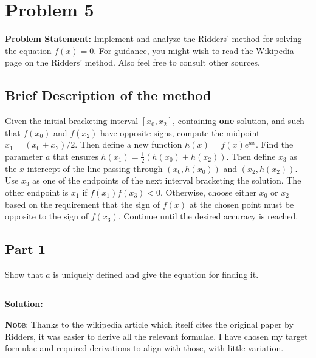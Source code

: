 \clearpage
\section*{Problem 5}

\textbf{Problem Statement:} Implement and analyze the Ridders' method for solving the equation $f(x) = 0$. For guidance, you might wish to read the Wikipedia page on the Ridders' method. Also feel free to consult other sources.

\subsection*{Brief Description of the method}

Given the initial bracketing interval $[x_0, x_2]$, containing \textbf{one} solution, and such that $f(x_0)$ and $f(x_2)$ have opposite signs, compute the midpoint $x_1 = (x_0 + x_2)/2$. Then define a new function $h(x) = f(x)e^{ax}$. Find the parameter $a$ that ensures $h(x_1) = \frac{1}{2}(h(x_0) + h(x_2))$. Then define $x_3$ as the $x$-intercept of the line passing through $(x_0, h(x_0))$ and $(x_2, h(x_2))$. Use $x_3$ as one of the endpoints of the next interval bracketing the solution. The other endpoint is $x_1$ if $f(x_1)f(x_3) < 0$. Otherwise, choose either $x_0$ or $x_2$ based on the requirement that the sign of $f(x)$ at the chosen point must be opposite to the sign of $f(x_3)$. Continue until the desired accuracy is reached.

\subsection*{Part 1}

Show that $a$ is uniquely defined and give the equation for finding it.

\noindent\rule{\textwidth}{0.4pt}

\vspace{1em}

\textbf{Solution:}

\textbf{Note}: Thanks to the wikipedia article which itself cites the original paper by Ridders, it was easier to derive all the relevant formulae. I have chosen my target formulae and required derivations to align with those, with little variation. \\

